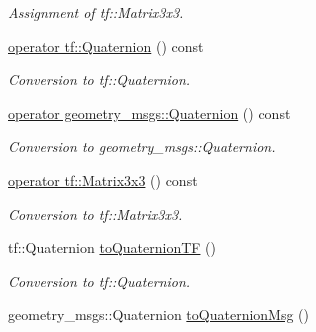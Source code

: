\begin{DoxyCompactItemize}
\begin{DoxyCompactList}\small\item\em Assignment of tf\+::\+Matrix3x3. \end{DoxyCompactList}\item 
\hyperlink{classow__core_1_1Rotation3Ref_ae7464db927a40cd9fbb5109169b7bb22}{operator tf\+::\+Quaternion} () const \hypertarget{classow__core_1_1Rotation3Ref_ae7464db927a40cd9fbb5109169b7bb22}{}\label{classow__core_1_1Rotation3Ref_ae7464db927a40cd9fbb5109169b7bb22}

\begin{DoxyCompactList}\small\item\em Conversion to tf\+::\+Quaternion. \end{DoxyCompactList}\item 
\hyperlink{classow__core_1_1Rotation3Ref_ae438d192b6b3d0d17331f26275370720}{operator geometry\+\_\+msgs\+::\+Quaternion} () const \hypertarget{classow__core_1_1Rotation3Ref_ae438d192b6b3d0d17331f26275370720}{}\label{classow__core_1_1Rotation3Ref_ae438d192b6b3d0d17331f26275370720}

\begin{DoxyCompactList}\small\item\em Conversion to geometry\+\_\+msgs\+::\+Quaternion. \end{DoxyCompactList}\item 
\hyperlink{classow__core_1_1Rotation3Ref_afc7e55ed5108a0ca56b6ef524be4962a}{operator tf\+::\+Matrix3x3} () const \hypertarget{classow__core_1_1Rotation3Ref_afc7e55ed5108a0ca56b6ef524be4962a}{}\label{classow__core_1_1Rotation3Ref_afc7e55ed5108a0ca56b6ef524be4962a}

\begin{DoxyCompactList}\small\item\em Conversion to tf\+::\+Matrix3x3. \end{DoxyCompactList}\item 
tf\+::\+Quaternion \hyperlink{classow__core_1_1Rotation3Ref_ad6db993cebda82f1b8f6d8ef78a498bf}{to\+Quaternion\+TF} ()\hypertarget{classow__core_1_1Rotation3Ref_ad6db993cebda82f1b8f6d8ef78a498bf}{}\label{classow__core_1_1Rotation3Ref_ad6db993cebda82f1b8f6d8ef78a498bf}

\begin{DoxyCompactList}\small\item\em Conversion to tf\+::\+Quaternion. \end{DoxyCompactList}\item 
geometry\+\_\+msgs\+::\+Quaternion \hyperlink{classow__core_1_1Rotation3Ref_a05ed8df1030e9d3370b6b25a03d5e140}{to\+Quaternion\+Msg} ()\hypertarget{classow__core_1_1Rotation3Ref_a05ed8df1030e9d3370b6b25a03d5e140}{}\label{classow__core_1_1Rotation3Ref_a05ed8df1030e9d3370b6b25a03d5e140}


\end{DoxyCompactItemize}
